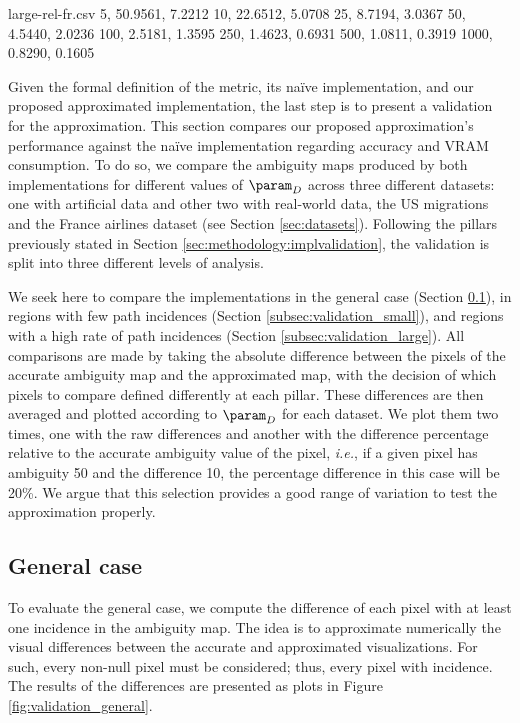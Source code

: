 \begin{filecontents*}[overwrite]{large-rel-fr.csv}
5,    50.9561, 7.2212
10,   22.6512, 5.0708
25,    8.7194, 3.0367
50,    4.5440, 2.0236
100,   2.5181, 1.3595
250,   1.4623, 0.6931
500,   1.0811, 0.3919
1000,  0.8290, 0.1605
\end{filecontents*}


Given the formal definition of the metric, its na\"ive implementation, and our proposed approximated implementation, the last step is to present a validation for the approximation. This section compares our proposed approximation's performance against the na\"ive implementation regarding accuracy and VRAM consumption. To do so, we compare the ambiguity maps produced by both implementations for different values of $\param_D$ across three different datasets: one with artificial data and other two with real-world data, the US migrations and the France airlines dataset (see Section \ref{sec:datasets}). Following the pillars previously stated in Section \ref{sec:methodology:implvalidation}, the validation is split into three different levels of analysis.

We seek here to compare the implementations in the general case (Section \ref{subsec:validation_general}), in regions with few path incidences (Section \ref{subsec:validation_small}), and regions with a high rate of path incidences (Section \ref{subsec:validation_large}). All comparisons are made by taking the absolute difference between the pixels of the accurate ambiguity map and the approximated map, with the decision of which pixels to compare defined differently at each pillar. These differences are then averaged and plotted according to $\param_D$ for each dataset. We plot them two times, one with the raw differences and another with the difference percentage relative to the accurate ambiguity value of the pixel, \emph{i.e.}, if a given pixel has ambiguity 50 and the difference 10, the percentage difference in this case will be 20\%. We argue that this selection provides a good range of variation to test the approximation properly.

\subsection{General case}
\label{subsec:validation_general}

To evaluate the general case, we compute the difference of each pixel with at least one incidence in the ambiguity map. The idea is to approximate numerically the visual differences between the accurate and approximated visualizations. For such, every non-null pixel must be considered; thus, every pixel with incidence. The results of the differences are presented as plots in Figure \ref{fig:validation_general}.

